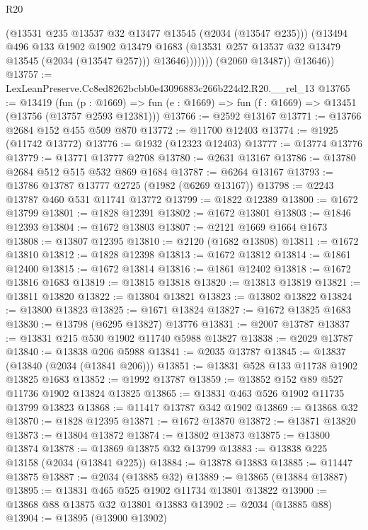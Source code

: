 \begin{lexlean}{R20}
\begin{coremodule}
                      (@13531 @235 @13537 @32 @13477 @13545 (@2034 (@13547 @235)))
                      (@13494
                        @496
                        @133
                        @1902
                        @1902
                        @13479
                        @1683
                        (@13531 @257 @13537 @32 @13479 @13545 (@2034 (@13547 @257)))
                        @13646)))))))
          (@2060 @13487))
        @13646))
@13757 := LexLeanPreserve.Cc8ed8262bcbb0e43096883c266b224d2.R20.__rel_13
@13765 := @13419
    (fun (p : @1669) => fun (e : @1669) => fun (f : @1669) => @13451 (@13756 (@13757 @2593 @12381)))
@13766 := @2592 @13167
@13771 := @13766 @2684 @152 @455 @509 @870
@13772 := @11700 @12403
@13774 := @1925 (@11742 @13772)
@13776 := @1932 (@12323 @12403)
@13777 := @13774 @13776
@13779 := @13771 @13777 @2708
@13780 := @2631 @13167
@13786 := @13780 @2684 @512 @515 @532 @869 @1684
@13787 := @6264 @13167
@13793 := @13786 @13787 @13777 @2725 (@1982 (@6269 @13167))
@13798 := @2243 @13787 @460 @531 @11741 @13772
@13799 := @1822 @12389
@13800 := @1672 @13799
@13801 := @1828 @12391
@13802 := @1672 @13801
@13803 := @1846 @12393
@13804 := @1672 @13803
@13807 := @2121 @1669 @1664 @1673
@13808 := @13807 @12395
@13810 := @2120 (@1682 @13808)
@13811 := @1672 @13810
@13812 := @1828 @12398
@13813 := @1672 @13812
@13814 := @1861 @12400
@13815 := @1672 @13814
@13816 := @1861 @12402
@13818 := @1672 @13816 @1683
@13819 := @13815 @13818
@13820 := @13813 @13819
@13821 := @13811 @13820
@13822 := @13804 @13821
@13823 := @13802 @13822
@13824 := @13800 @13823
@13825 := @1671 @13824
@13827 := @1672 @13825 @1683
@13830 := @13798 (@6295 @13827) @13776
@13831 := @2007 @13787
@13837 := @13831 @215 @530 @1902 @11740 @5988 @13827
@13838 := @2029 @13787
@13840 := @13838 @206 @5988
@13841 := @2035 @13787
@13845 := @13837 (@13840 (@2034 (@13841 @206)))
@13851 := @13831 @528 @133 @11738 @1902 @13825 @1683
@13852 := @1992 @13787
@13859 := @13852 @152 @89 @527 @11736 @1902 @13824 @13825
@13865 := @13831 @463 @526 @1902 @11735 @13799 @13823
@13868 := @11417 @13787 @342 @1902
@13869 := @13868 @32
@13870 := @1828 @12395
@13871 := @1672 @13870
@13872 := @13871 @13820
@13873 := @13804 @13872
@13874 := @13802 @13873
@13875 := @13800 @13874
@13878 := @13869 @13875 @32 @13799
@13883 := @13838 @225 @13158 (@2034 (@13841 @225))
@13884 := @13878 @13883
@13885 := @11447 @13875
@13887 := @2034 (@13885 @32)
@13889 := @13865 (@13884 @13887)
@13895 := @13831 @465 @525 @1902 @11734 @13801 @13822
@13900 := @13868 @88 @13875 @32 @13801 @13883
@13902 := @2034 (@13885 @88)
@13904 := @13895 (@13900 @13902)

\end{coremodule}
\end{lexlean}
